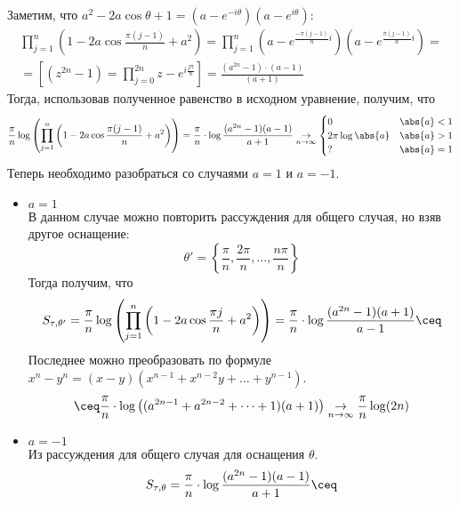 \begin{example}
\begin{enumerate}
    Заметим, что $a ^ 2 - 2a \cos{\theta} + 1 = (a - e ^ {-i \theta})(a - e ^ {i \theta})$:
    \[
        \begin{gathered}
            \prod_{j = 1}^n \left(1 - 2a \cos{\frac{\pi (j - 1)}{n} + a ^ 2}\right)=
            \prod_{j = 1}^n \left(a - e ^ {\frac{-\pi (j - 1)}{n} i }\right)\left(a - e ^ {\frac{\pi (j - 1)}{n} i }\right)=\\
            =\left[(z^{2n} - 1) = \prod\limits_{j=0}^{2n}{z - e^{i\frac{j \pi}{n}}}\right]=
            \frac{(a ^ {2n} - 1) \cdot (a - 1)}{(a + 1)} 
        \end{gathered}
    \]
    Тогда, использовав полученное равенство в исходном уравнение, получим, что 
    \[
        \frac{\pi}{n} \log\left(\prod_{j = 1}^n \left(1 - 2a \cos{\frac{\pi (j - 1)}{n} + a ^ 2}\right)\right)=
        \frac{\pi}{n} \cdot \log{\frac{(a ^ {2n} - 1)(a - 1)}{a + 1}} \underset{n \to \infty}{\to}
        \begin{cases}
            0 & \abs{a} < 1 \\
            2 \pi \log{\abs{a}} & \abs{a} > 1 \\
            ? & \abs{a} = 1
        \end{cases}
    \]
    Теперь необходимо разобраться со случаями $a = 1$ и $a = -1$.
    \begin{itemize}
        \item $a = 1$\\
            В данном случае можно повторить рассуждения для общего случая, но взяв другое оснащение: 
            \[
                \theta' = \left\{\frac{\pi}{n}, \frac{2\pi}{n}, \dots, \frac{n\pi}{n}\right\}
            \] 
            Тогда получим, что 
            \[
                S_{\tau, \theta'} = \frac{\pi}{n} \log\left(\prod_{j = 1}^n \left(1 - 2a \cos{\frac{\pi j}{n} + a ^ 2}\right)\right)=
                \frac{\pi}{n} \cdot \log{\frac{(a ^ {2n} - 1)(a + 1)}{a - 1}} \ceq\\
            \] 
            Последнее можно преобразовать по формуле $x^n - y^n = (x - y)(x^{n - 1} + x^{n - 2}y + \dots + y^{n - 1})$.
            \[
                \ceq \frac{\pi}{n}\cdot \log\left((a^{2n - 1}+a^{2n - 2} + \dots + 1)(a + 1)\right)
                \underset{n\to\infty}{\to} \frac{\pi}{n}\log(2n)
            \] 
        \item $a = -1$\\
            Из рассуждения для общего случая для оснащения $\theta$.
            \[
                S_{\tau,\theta} = \frac{\pi}{n} \cdot \log{\frac{(a ^ {2n} - 1)(a - 1)}{a + 1}} \ceq
\]
\end{itemize}
\end{enumerate}
\end{example}
